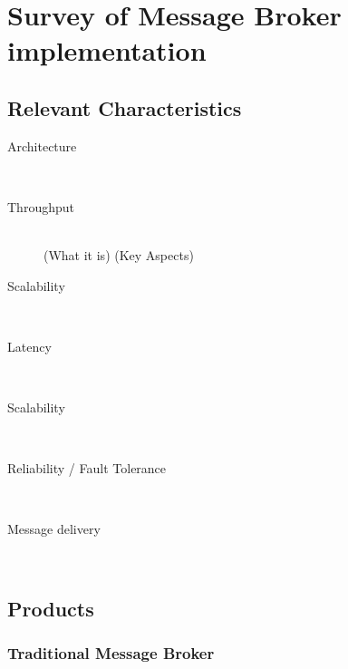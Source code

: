 \chapter{Survey of Message Broker implementation} 
\label{survey-broker}

\section{Relevant Characteristics}
\begin{description}
    \item [Architecture] \hfill \\
    {}
    \item [Throughput] \hfill \\
        { (What it is) (Key Aspects)}
    \item [Scalability] \hfill \\
    {}
    \item [Latency]\hfill \\
    {}
    \item [Scalability] \hfill \\
    {}
    \item [Reliability / Fault Tolerance] \hfill \\
    {}
    \item [Message delivery] \hfill \\
    {}

\end{description}
\section{Products}
\subsection{Traditional Message Broker}

